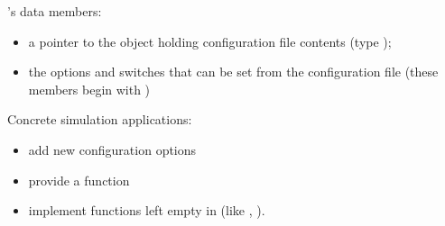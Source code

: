 's data members:
\begin{itemize}
  \item{a pointer to the object holding configuration file contents
    (type );}
  \item{the options and switches that can be set from the
    configuration file (these members begin with )}
\end{itemize}

Concrete simulation applications:
\begin{itemize}
  \item{add new configuration options}
  \item{provide a  function}
  \sloppy
  \item{implement functions left empty in  (like
    , ).}
\end{itemize}


%
%
%

